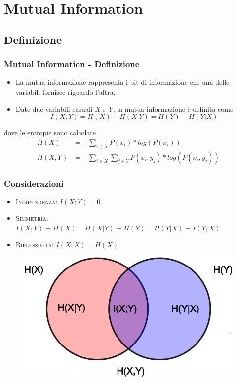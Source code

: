 \documentclass{beamer}
\begin{document}
\section{Mutual Information}
\subsection{Definizione}
\begin{frame}
	\frametitle{Mutual Information - Definizione}
		\nocite{Ding:2003:MRF:937976.938050}
		\nocite{Peng05featureselection}
	\begin{itemize}
		\item La mutua informazione rappresenta i bit di informazione che una delle variabili fornisce riguardo l'altra.
		\item Date due variabili casuali \emph{X} e \emph{Y}, la mutua informazione è definita come $$I(X; Y ) = H(X) − H(X|Y ) = H(Y ) − H(Y |X)$$
	\end{itemize}
	dove le entropie sono calcolate \newline
	\begin{align*}
		H(X)&= - \sum_{i \in X}{P(x_i)*log(P(x_i))} \\
		H(X,Y)&= - \sum_{i \in X}\sum_{j \in Y}{P(x_i,y_j)*log(P(x_i,y_j))}
	\end{align*}
\end{frame}
\begin{frame}
	\frametitle{Considerazioni}
	\begin{adjustwidth}{-2.1em}{-2.1em}
	\begin{itemize}
		\item \textsc{Indipendenza:} $I(X;Y)=0$ \newline
		\item \textsc{Simmetria:} $I(X;Y) = H(X)-H(X|Y)=H(Y)-H(Y|X)= I(Y;X)$ \newline
		\item \textsc{Riflessività:} $I(X;X)=H(X)$ \newline
	\end{itemize}
	\begin{figure}[htb]
		\vspace{-0.2cm}
		\includegraphics[width=.48\textwidth]{figure/mutual.png}
	\end{figure}

	\end{adjustwidth}
\end{frame}
\end{document}
